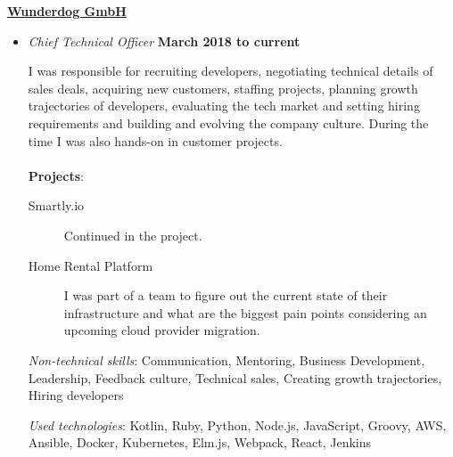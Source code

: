 \documentclass[10pt,english,a4paper]{article}
\newenvironment{outerlist}[1][\enskip\textbullet]%
        {\begin{itemize}[#1]}{\end{itemize}%
         \vspace{-.6\baselineskip}}
\newcommand{\blankline}{\quad\pagebreak[2]}
\begin{document}
\href{http://www.wunderdog.fi/}{\textbf{Wunderdog GmbH}}
\begin{outerlist}

  \item[] \textit{Chief Technical Officer}%
  \hfill \textbf{March 2018 to current }
  \par
  I was responsible for recruiting developers, negotiating technical details of sales deals, acquiring new customers,
  staffing projects, planning growth trajectories of developers, evaluating the tech market and setting hiring requirements and building and evolving the company culture.
  During the time I was also hands-on in customer projects.
  \\
  \\
  \textbf{Projects}:
  \begin{description}
    \item [Smartly.io] Continued in the project.
    \item [Home Rental Platform] I was part of a team to figure out the current state of their infrastructure and what are the biggest pain points considering an upcoming cloud provider migration.
  \end{description}

  \emph{Non-technical skills}: Communication, Mentoring, Business Development, Leadership, Feedback culture, Technical sales, Creating growth trajectories, Hiring developers
  \par
  \emph{Used technologies}: Kotlin, Ruby, Python, Node.js, JavaScript, Groovy, AWS, Ansible, Docker, Kubernetes, Elm.js, Webpack, React, Jenkins\\
\end{outerlist}
\blankline
\end{document}
